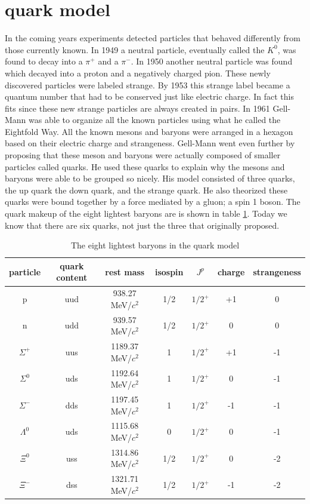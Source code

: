 \documentclass[abstract = on,listof=totoc, bibliography=totoc]{scrreprt}
\begin{document}
\section{quark model}

In the coming years experiments detected particles that behaved differently from those currently known. In 1949 a neutral particle, eventually called the $K^0$, was found to decay into a $\pi^+$ and a $\pi^-$. In 1950 another neutral particle was found which decayed into a proton and a negatively charged pion. These newly discovered particles were labeled strange. By 1953 this strange label became a quantum number that had to be conserved just like electric charge. In fact this fits since these new strange particles are always created in pairs. In 1961 Gell-Mann was able to organize all the known particles using what he called the Eightfold Way. All the known mesons and baryons were arranged in a hexagon based on their electric charge and strangeness.  Gell-Mann went even further by proposing that these meson and baryons were actually composed of smaller particles called quarks. He used these quarks to explain why the mesons and baryons were able to be grouped so nicely. His model consisted of three quarks, the up quark the down quark, and the strange quark. He also theorized these quarks were bound together by a force mediated by a gluon; a spin 1 boson. The quark makeup of the eight lightest baryons are is shown in table \ref{tab:baryontable}. Today we know that there are six quarks, not just the three that originally proposed. 

\begin{center}
\begin{table}[h!]
\begin{tabular}{|c|c|c|c|c|c|c|} \hline
particle & quark content & rest mass & isospin & $J^p$ & charge & strangeness \\
\hline
p			& uud & 938.27 MeV/$c^2$ 		& 1/2 & $1/2^+$ & +1 & 0  \\
n			& udd & 939.57 MeV/$c^2$		& 1/2 & $1/2^+$ & 0   & 0  \\
$\Sigma^+$	& uus & 1189.37 MeV/$c^2$		& 1    & $1/2^+$ & +1 & -1 \\
$\Sigma^0$	& uds & 1192.64 MeV/$c^2$		& 1    & $1/2^+$ & 0 & -1 \\
$\Sigma^-$	& dds & 1197.45 MeV/$c^2$		& 1    & $1/2^+$ & -1 & -1 \\
$\Lambda^0$	& uds & 1115.68 MeV/$c^2$		& 0    & $1/2^+$ & 0 & -1 \\
$\Xi^0$		& uss & 1314.86 MeV/$c^2$		& 1/2  & $1/2^+$ & 0 & -2 \\
$\Xi^-$		& dss & 1321.71 MeV/$c^2$		& 1/2  & $1/2^+$ & -1 & -2 \\
\hline
\end{tabular}
\caption{The eight lightest baryons in the quark model}
\label{tab:baryontable}
\end{table}
\end{center}
\end{document}
